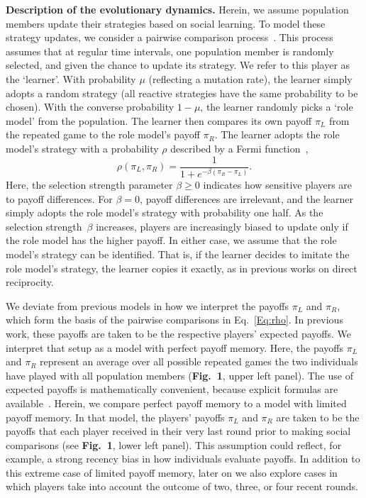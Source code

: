 \documentclass[11pt]{article}
\newcommand{\FigBaseResults}{{\bf Fig.~1}}
\theoremstyle{plainCl1}
\theoremstyle{plainCl2}
\begin{document}
\noindent
{\bf Description of the evolutionary dynamics.}
Herein, we assume population members update their strategies based on social learning. 
To model these strategy updates, we consider a pairwise comparison process~\citep{traulsen2007pairwise}. 
This process assumes that at regular time intervals, one population member is randomly selected, and given the chance to update its strategy.
We refer to this player as the `learner'. 
With probability $\mu$ (reflecting a mutation rate), the learner simply adopts a random strategy (all reactive strategies have the same probability to be chosen). 
With the converse probability $1\!-\!\mu$, the learner randomly picks a `role model' from the population. 
The learner then compares its own payoff $\pi_L$ from the repeated game to the role model's payoff $\pi_R$. 
The learner adopts the role model's strategy with a probability \(\rho\) described by a Fermi function~\citep{blume:GEB:1995,szabo:PRE:1998}, 
\begin{equation} \label{Eq:rho}
    \rho(\pi_{L}, \pi_{R}) = \frac{1}{1\!+\! e^{- \!\beta (\pi_{R}- \pi_{L})}}.
\end{equation}
Here, the selection strength parameter $\beta\!\ge\!0$ indicates how sensitive players are to payoff differences. 
For $\beta\!=\!0$, payoff differences are irrelevant, and the learner simply adopts the role model's strategy with probability one half. As the selection strength~$\beta$ increases, players are increasingly biased to update only if the role model has the higher payoff. 
In either case, we assume that the role model's strategy can be identified.
That is, if the learner decides to imitate the role model's strategy, the learner copies it exactly, as in previous works on direct reciprocity. 


We deviate from previous models in how we interpret the payoffs $\pi_L$ and $\pi_R$, which form the basis of the pairwise comparisons in Eq.~\eqref{Eq:rho}. 
In previous work, these payoffs are taken to be the respective players' expected payoffs. 
We interpret that setup as a model with perfect payoff memory. 
Here, the payoffs  $\pi_L$ and $\pi_R$ represent an average over all possible repeated games the two individuals have played with all population members (\FigBaseResults, upper left panel). 
The use of expected payoffs is mathematically convenient, because explicit formulas are available~\citep{hofbauer1998evolutionary}.
Herein, we compare perfect payoff memory to a model with limited payoff memory. 
In that model, the players' payoffs $\pi_L$ and $\pi_R$ are taken to be the payoffs that each player received in their very last round prior to making social comparisons (see \FigBaseResults, lower left panel). 
This assumption could reflect, for example, a strong recency bias in how individuals evaluate payoffs.  
In addition to this extreme case of limited payoff memory, later on we also explore cases in which players take into account the outcome of two, three, or four recent rounds. 
\end{document}
